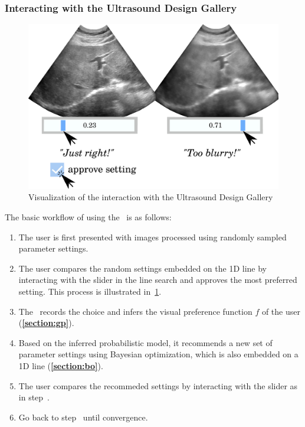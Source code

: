 \subsubsection{Interacting with the Ultrasound Design Gallery}
%
\begin{figure}[h]
  \centering
  \includegraphics[scale=0.3]{figures/ui_interaction.pdf}
  \caption{Visualization of the interaction with the Ultrasound Design Gallery}\label{fig:interaction}
\end{figure}
%
The basic workflow of using the \usdg~is as follows:
\begin{enumerate}
\item[\ding{182}] The user is first presented with images processed using randomly sampled parameter settings.
\item[\ding{183}] The user compares the random settings embedded on the 1D line by interacting with the slider in the line search and approves the most preferred setting. This process is illustrated in~\cref{fig:interaction}.
\item[\ding{184}] The \usdg~records the choice and infers the visual preference function \(f\) of the user (\textbf{\cref{section:gp}}).
\item[\ding{185}] Based on the inferred probabilistic model, it recommends a new set of parameter settings using Bayesian optimization, which is also embedded on a 1D line (\textbf{\cref{section:bo}}).
\item[\ding{186}] The user compares the recommeded settings by interacting with the slider as in step~.
\item[\ding{187}] Go back to step~ until convergence.
\end{enumerate}

